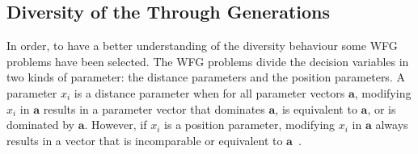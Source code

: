 \subsection{Diversity of the \MOEAS{} Through Generations}

In order, to have a better understanding of the diversity behaviour some WFG problems have been selected.
%
The WFG problems divide the decision variables in two kinds of parameter: the distance parameters and the position parameters.
%
A parameter $x_i$ is a distance parameter when for all parameter vectors $\mathbf{a}$, modifying $x_i$ in $\mathbf{a}$ results in a parameter vector that dominates $\mathbf{a}$, is equivalent to $\mathbf{a}$, or is dominated by $\mathbf{a}$.
%
However, if $x_i$ is a position parameter, modifying $x_i$ in $\mathbf{a}$ always results in a vector that is incomparable or equivalent to $\mathbf{a}$~\cite{huband2005scalable}.
%

